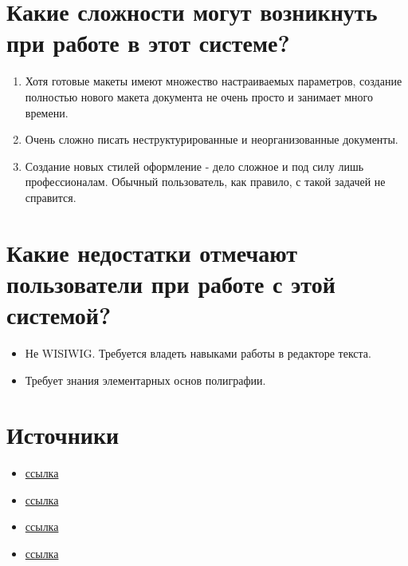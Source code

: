 \documentclass[a4paper,12pt]{article} %
\begin{document}
\section{Какие сложности могут возникнуть при работе в этот системе?}
\begin{enumerate}
\item Хотя готовые макеты имеют множество настраиваемых параметров, создание {\Large полностью} нового макета документа не очень просто и занимает много времени.
\item Очень сложно писать неструктурированные и неорганизованные документы.
\item Создание новых стилей оформление - дело сложное и под силу лишь профессионалам. Обычный пользователь, как правило, с такой задачей не справится.
\end{enumerate}

\section{Какие недостатки отмечают пользователи при работе с этой системой?}
\begin{itemize}
\item Не WISIWIG. Требуется владеть навыками работы в редакторе текста.
\item Требует знания элементарных основ полиграфии.
\end{itemize}

\section{Источники}
\begin{itemize}
\item \href{https://astronu.jinr.ru/wiki/images/b/bf/KotelnikovChebotaev.pdf}{ссылка}
\item \href{http://tex.imm.uran.ru/tex/2e/lshort2e/node8.html}{ссылка}
\item \href{https://www.opennet.ru/docs/RUS/linux_base/node381.html}{ссылка}
\item \href{https://kartaslov.ru/значение-слова/библиография}{ссылка}
\end{itemize}
\end{document}

